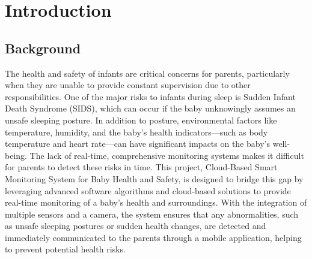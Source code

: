 \documentclass[12pt,a4paper]{report}
\begin{document}
\renewcommand{\contentsname}{\centering Table of Contents}
\tableofcontents
\newpage
{}
\listoffigures
{}
\listoftables
{}
\newpage

\pagestyle{fancy}
\fancyhf{}
\renewcommand{\headrulewidth}{0.5pt}
\renewcommand{\footrulewidth}{0.5pt}



\chapter{Introduction}
\par
\section{Background}
The health and safety of infants are critical concerns for parents, particularly when they are unable to provide constant supervision due to other responsibilities. One of the major risks to infants during sleep is Sudden Infant Death Syndrome (SIDS), which can occur if the baby unknowingly assumes an unsafe sleeping posture. In addition to posture, environmental factors like temperature, humidity, and the baby’s health indicators—such as body temperature and heart rate—can have significant impacts on the baby’s well-being. The lack of real-time, comprehensive monitoring systems makes it difficult for parents to detect these risks in time. This project, Cloud-Based Smart Monitoring System for Baby Health and Safety, is designed to bridge this gap by leveraging advanced software algorithms and cloud-based solutions to provide real-time monitoring of a baby’s health and surroundings. With the integration of multiple sensors and a camera, the system ensures that any abnormalities, such as unsafe sleeping postures or sudden health changes, are detected and immediately communicated to the parents through a mobile application, helping to prevent potential health risks.
\end{document}
